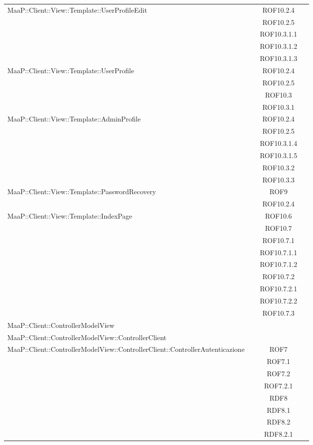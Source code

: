 \begin{center}
\begin{longtable}{|p{0.8\linewidth}|c|}
\midrule
MaaP::Client::View::Template::UserProfileEdit
& ROF10.2.4\\
& ROF10.2.5\\
& ROF10.3.1.1\\
& ROF10.3.1.2\\
& ROF10.3.1.3\\

\midrule
MaaP::Client::View::Template::UserProfile
& ROF10.2.4\\
& ROF10.2.5\\
& ROF10.3\\
& ROF10.3.1\\

\midrule
MaaP::Client::View::Template::AdminProfile
& ROF10.2.4\\
& ROF10.2.5\\
& ROF10.3.1.4\\
& ROF10.3.1.5\\
& ROF10.3.2\\
& ROF10.3.3\\


\midrule
MaaP::Client::View::Template::PasswordRecovery
& ROF9\\
& ROF10.2.4\\

\midrule
MaaP::Client::View::Template::IndexPage
& ROF10.6\\
& ROF10.7\\
& ROF10.7.1\\
& ROF10.7.1.1\\
& ROF10.7.1.2\\
& ROF10.7.2\\
& ROF10.7.2.1\\
& ROF10.7.2.2\\
& ROF10.7.3\\

\midrule
MaaP::Client::ControllerModelView
& \\

\midrule
MaaP::Client::ControllerModelView::ControllerClient
& \\

\midrule
MaaP::Client::ControllerModelView::ControllerClient::ControllerAutenticazione
& ROF7\\
& ROF7.1\\
& ROF7.2\\
& ROF7.2.1\\
& RDF8\\
& RDF8.1\\
& RDF8.2\\
& RDF8.2.1\\


\end{longtable}
\end{center}
